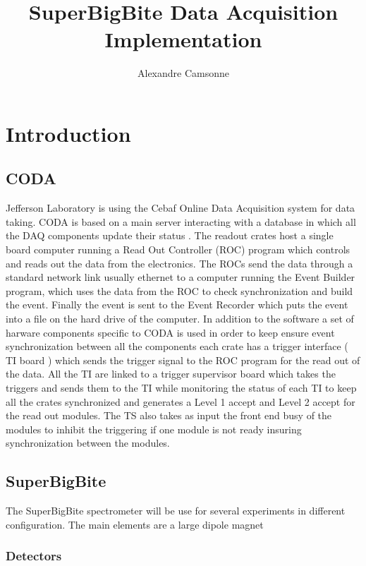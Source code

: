 \documentclass{article}
\title {SuperBigBite Data Acquisition Implementation}
\author{Alexandre Camsonne}
\begin{document}
\section{Introduction}
\subsection{CODA}
Jefferson Laboratory is using the Cebaf Online Data Acquisition system for data taking.
CODA is based on a main server interacting with a database in which all the DAQ components update their status . The readout crates host a single board computer running a Read Out Controller (ROC) program which controls and reads out the data from the electronics. The ROCs send the data through a standard network link usually ethernet to a computer running the Event Builder program, which uses the data from the ROC to check synchronization and build the event. Finally the event is sent to the Event Recorder which puts the event into a file on the hard drive of the computer.
In addition to the software a set of harware components specific to CODA is used in order to keep ensure event synchronization between all the components each crate has a trigger interface ( TI board ) which sends the trigger signal to the ROC program for the read out of the data. All the TI are linked to a trigger supervisor board which takes the triggers and sends them to the TI while monitoring the status of each TI to keep all the crates synchronized and generates a Level 1 accept and Level 2 accept for the read out modules. The TS also takes as input the front end busy of the modules to inhibit the triggering if one module is not ready insuring synchronization between the modules.

\subsection{SuperBigBite}
The SuperBigBite spectrometer will be use for several experiments in different configuration. The main elements are a large dipole magnet


\subsubsection{Detectors}
\end{document}
